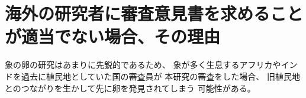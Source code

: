 
\section{海外の研究者に審査意見書を求めることが適当でない場合、その理由 }

	象の卵の研究はあまりに先鋭的であるため、
	象が多く生息するアフリカやインドを過去に植民地としていた国の審査員が
	本研究の審査をした場合、
	旧植民地とのつながりを生かして先に卵を発見されてしまう
	可能性がある。



